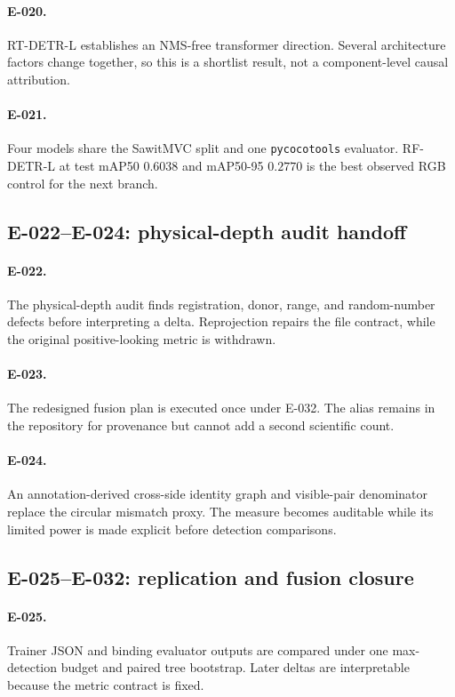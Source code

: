 \documentclass[preprint,12pt]{elsarticle}
\begin{document}
\paragraph{E-020.} RT-DETR-L establishes an NMS-free transformer direction.
Several architecture factors change together, so this is a shortlist result,
not a component-level causal attribution.
\paragraph{E-021.} Four models share the SawitMVC split and one
\texttt{pycocotools} evaluator. RF-DETR-L at test mAP50 \(0.6038\) and
mAP50-95 \(0.2770\) is the best observed RGB control for the next branch.
\subsection{E-022--E-024: physical-depth audit handoff}
\paragraph{E-022.} The physical-depth audit finds registration, donor, range,
and random-number defects before interpreting a delta. Reprojection repairs
the file contract, while the original positive-looking metric is withdrawn.
\paragraph{E-023.} The redesigned fusion plan is executed once under E-032.
The alias remains in the repository for provenance but cannot add a second
scientific count.
\paragraph{E-024.} An annotation-derived cross-side identity graph and visible-pair denominator
replace the circular mismatch proxy. The measure becomes auditable while its
limited power is made explicit before detection comparisons.

\subsection{E-025--E-032: replication and fusion closure}
\paragraph{E-025.} Trainer JSON and binding evaluator outputs are compared
under one max-detection budget and paired tree bootstrap. Later deltas are
interpretable because the metric contract is fixed.
\end{document}
